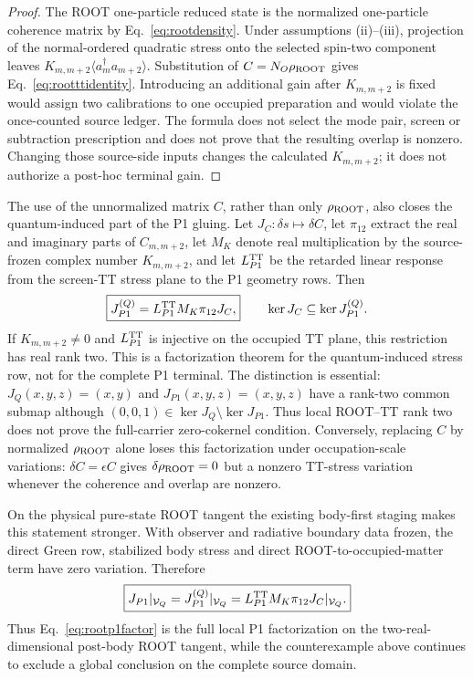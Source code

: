 \documentclass[11pt]{article}
\begin{document}
\begin{proof}
The ROOT one-particle reduced state is the normalized one-particle coherence matrix by
Eq.~\eqref{eq:rootdensity}.  Under assumptions (ii)--(iii), projection of the
normal-ordered quadratic stress onto the selected spin-two component leaves
$K_{m,m+2}\langle a_m^\dagger a_{m+2}\rangle$.  Substitution of
$C=N_O\rho_{\rm ROOT}$ gives Eq.~\eqref{eq:rootttidentity}.  Introducing an
additional gain after $K_{m,m+2}$ is fixed would assign two calibrations to one
occupied preparation and would violate the once-counted source ledger.  The
formula does not select the mode pair, screen or subtraction prescription and
does not prove that the resulting overlap is nonzero.  Changing those
source-side inputs changes the calculated $K_{m,m+2}$; it does not authorize a
post-hoc terminal gain.
\end{proof}

The use of the unnormalized matrix $C$, rather than only
$\rho_{\rm ROOT}$, also closes the quantum-induced part of the P1 gluing.
Let $J_C:\delta s\mapsto\delta C$, let $\pi_{12}$ extract the real and
imaginary parts of $C_{m,m+2}$, let $M_K$ denote real multiplication by the
source-frozen complex number $K_{m,m+2}$, and let $L_{P1}^{\rm TT}$ be the
retarded linear response from the screen-TT stress plane to the P1 geometry
rows.  Then
\begin{equation}
\boxed{
J_{P1}^{(Q)}=L_{P1}^{\rm TT}M_K\pi_{12}J_C,}
\qquad
\ker J_C\subseteq\ker J_{P1}^{(Q)}.
\label{eq:rootp1factor}
\end{equation}
If $K_{m,m+2}\neq0$ and $L_{P1}^{\rm TT}$ is injective on the occupied TT
plane, this restriction has real rank two.  This is a factorization theorem
for the quantum-induced stress row, not for the complete P1 terminal.  The
distinction is essential: $J_Q(x,y,z)=(x,y)$ and
$J_{P1}(x,y,z)=(x,y,z)$ have a rank-two common submap although
$(0,0,1)\in\ker J_Q\setminus\ker J_{P1}$.  Thus local ROOT--TT rank two does
not prove the full-carrier zero-cokernel condition.  Conversely, replacing
$C$ by normalized $\rho_{\rm ROOT}$ alone loses this factorization under
occupation-scale variations: $\delta C=\epsilon C$ gives
$\delta\rho_{\rm ROOT}=0$ but a nonzero TT-stress variation whenever the
coherence and overlap are nonzero.

On the physical pure-state ROOT tangent the existing body-first staging makes
this statement stronger.  With observer and radiative boundary data frozen,
the direct Green row, stabilized body stress and direct
ROOT-to-occupied-matter term have zero variation.  Therefore
\begin{equation}
\boxed{
J_{P1}|_{\mathcal V_Q}
=J_{P1}^{(Q)}|_{\mathcal V_Q}
=L_{P1}^{\rm TT}M_K\pi_{12}J_C|_{\mathcal V_Q}.}
\label{eq:rootp1tangentfactor}
\end{equation}
Thus Eq.~\eqref{eq:rootp1factor} is the full local P1 factorization on the
two-real-dimensional post-body ROOT tangent, while the counterexample above
continues to exclude a global conclusion on the complete source domain.
\end{document}
